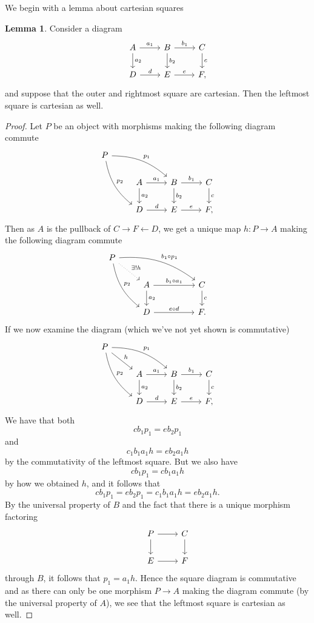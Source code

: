 \documentclass{article}
\theoremstyle{definition}
\newtheorem{lemma}[theorem]{Lemma}
\begin{document}
We begin with a lemma about cartesian squares
\begin{lemma}
	Consider a diagram
	\[
		\begin{tikzcd}
			& A
			\ar[r, "a_{1}"]
			\ar[d, "a_{2}"]
			& B
			\ar[r, "b_{1}"]
			\ar[d, "b_{2}"]
			& C
			\ar[d, "c"] \\
			& D
			\ar[r, "d"]
			& E
			\ar[r, "e"]
			& F,
		\end{tikzcd}
	\]
	and suppose that the outer and rightmost square are cartesian. Then the
	leftmost square is cartesian as well.
\end{lemma}
\begin{proof}
	Let $P$ be an object with morphisms making the following diagram commute
	\[
		\begin{tikzcd}
			P
			\ar[drr, "p_{1}", bend left=20]
			\ar[ddr, "p_{2}", bend right=20] \\
			& A
			\ar[r, "a_{1}"]
			\ar[d, "a_{2}"]
			& B
			\ar[r, "b_{1}"]
			\ar[d, "b_{2}"]
			& C
			\ar[d, "c"] \\
			& D
			\ar[r, "d"]
			& E
			\ar[r, "e"]
			& F,
		\end{tikzcd}
	\]
	Then as $A$ is the pullback of $C \rightarrow F \leftarrow D$, we get a unique map $h : P \to A$
	making the following diagram commute
	\[
		\begin{tikzcd}
			P
			\ar[dr, dotted, "\exists! h"]
			\ar[drrr, bend left=20, "b_{1} \circ p_{1}"]
			\ar[ddr, bend right=20, "p_{2}"] \\
			& A
			\ar[rr, "b_{1} \circ a_{1}"]
			\ar[d, "a_{2}"]
			&
			& C
			\ar[d, "c"] \\
			& D
			\ar[rr, "e \circ d"]
			&
			& F.
		\end{tikzcd}
	\]
	If we now examine the diagram (which we've not yet shown is commutative)
	\[
		\begin{tikzcd}
			P
			\ar[dr, "h"]
			\ar[drr, "p_{1}", bend left=20]
			\ar[ddr, "p_{2}", bend right=20] \\
			& A
			\ar[r, "a_{1}"]
			\ar[d, "a_{2}"]
			& B
			\ar[r, "b_{1}"]
			\ar[d, "b_{2}"]
			& C
			\ar[d, "c"] \\
			& D
			\ar[r, "d"]
			& E
			\ar[r, "e"]
			& F,
		\end{tikzcd}
	\]
	We have that both
	\[
		cb_{1}p_{1} = e b_{2} p_{1}
	\]
	and
	\[
		c_{1} b_{1} a_{1} h = e b_{2} a_{1} h
	\]
	by the commutativity of the leftmost square. But we also
	have
	\[
		cb_{1}p_{1} = c b_{1} a_{1} h
	\]
	by how we obtained $h$, and it follows that
	\[
		cb_{1}p_{1} = e b_{2} p_{1}
		=
		c_{1} b_{1} a_{1} h = e b_{2} a_{1} h.
	\]
	By the universal property of $B$ and the fact that there
	is a unique morphism factoring
	\[
		\begin{tikzcd}
			& P
			\ar[r, ""]
			\ar[d, ""]
			& C
			\ar[d, ""] \\
			& E
			\ar[r, ""]
			& F
		\end{tikzcd}
	\]
	through $B$, it follows that $p_{1} = a_{1} h$. Hence the square diagram is
	commutative and as there can only be one morphism $P \to A$ making the
	diagram commute (by the universal property of $A$), we see that the
	leftmost square is cartesian as well.
\end{proof}
\end{document}
